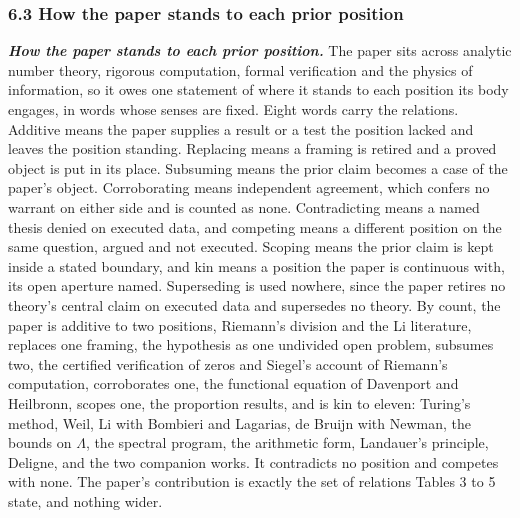 \documentclass[10pt]{article}
\begin{document}
\hypertarget{how-the-paper-stands-to-each-prior-position}{%
\subsubsection{6.3 How the paper stands to each prior
position}\label{how-the-paper-stands-to-each-prior-position}}

\textbf{\emph{How the paper stands to each prior position.}} The paper
sits across analytic number theory, rigorous computation, formal
verification and the physics of information, so it owes one statement of
where it stands to each position its body engages, in words whose senses
are fixed. Eight words carry the relations. Additive means the paper
supplies a result or a test the position lacked and leaves the position
standing. Replacing means a framing is retired and a proved object is
put in its place. Subsuming means the prior claim becomes a case of the
paper's object. Corroborating means independent agreement, which confers
no warrant on either side and is counted as none. Contradicting means a
named thesis denied on executed data, and competing means a different
position on the same question, argued and not executed. Scoping means
the prior claim is kept inside a stated boundary, and kin means a
position the paper is continuous with, its open aperture named.
Superseding is used nowhere, since the paper retires no theory's central
claim on executed data and supersedes no theory. By count, the paper is
additive to two positions, Riemann's division and the Li literature,
replaces one framing, the hypothesis as one undivided open problem,
subsumes two, the certified verification of zeros and Siegel's account
of Riemann's computation, corroborates one, the functional equation of
Davenport and Heilbronn, scopes one, the proportion results, and is kin
to eleven: Turing's method, Weil, Li with Bombieri and Lagarias, de
Bruijn with Newman, the bounds on \(\Lambda\), the spectral program, the
arithmetic form, Landauer's principle, Deligne, and the two companion
works. It contradicts no position and competes with none. The paper's
contribution is exactly the set of relations Tables 3 to 5 state, and
nothing wider.
\end{document}
